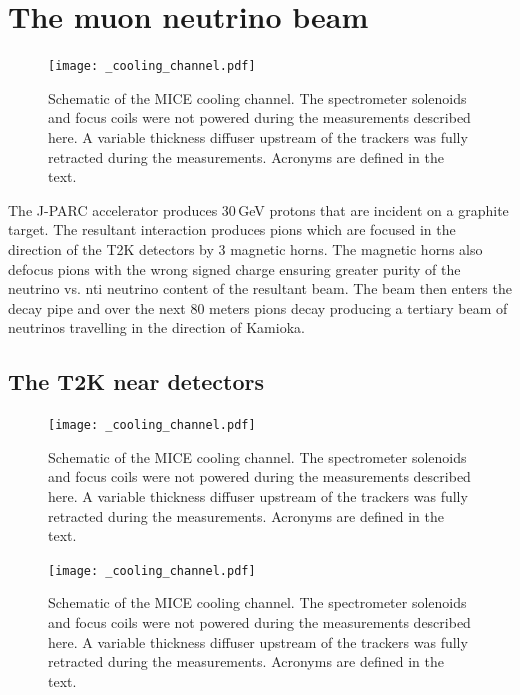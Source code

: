 \documentclass[%
 reprint,
 amsmath,amssymb,
 aps,
]{revtex4-2}
\begin{document}
\section{\label{Sect:Data}The muon neutrino beam}
\begin{figure}[htbp]
\begin{center}
\texttt{[image: \_cooling\_channel.pdf]}
\end{center}
\caption{Schematic of the MICE cooling channel. The spectrometer solenoids and focus coils were not powered during the measurements described here. A variable thickness diffuser upstream of the trackers was fully retracted during the measurements. Acronyms are defined in the text.}
\label{fig:micecc}
\end{figure}

The J-PARC accelerator produces 30\,GeV protons that are incident on a graphite target. The resultant interaction produces pions which are focused in the direction of the T2K detectors by 3 magnetic horns. The magnetic horns also defocus pions with the wrong signed charge ensuring greater purity of the neutrino vs. nti neutrino content of the resultant beam. The beam then enters the decay pipe and over the next 80 meters pions decay producing a tertiary beam of neutrinos travelling in the direction of Kamioka. 

\subsection{The T2K near detectors}
\begin{figure}[htbp]
\begin{center}
\texttt{[image: \_cooling\_channel.pdf]}
\end{center}
\caption{Schematic of the MICE cooling channel. The spectrometer solenoids and focus coils were not powered during the measurements described here. A variable thickness diffuser upstream of the trackers was fully retracted during the measurements. Acronyms are defined in the text.}
\label{fig:micecc}
\end{figure}
\begin{figure}[htbp]
\begin{center}
\texttt{[image: \_cooling\_channel.pdf]}
\end{center}
\caption{Schematic of the MICE cooling channel. The spectrometer solenoids and focus coils were not powered during the measurements described here. A variable thickness diffuser upstream of the trackers was fully retracted during the measurements. Acronyms are defined in the text.}
\label{fig:micecc}
\end{figure}
\end{document}
